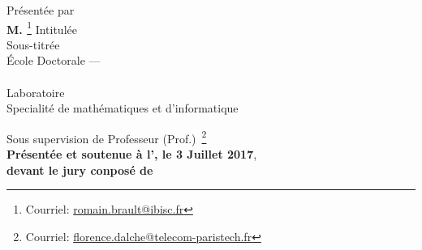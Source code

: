 \begin{titlepage}
\begin{addmargin}[-1cm]{-3cm}
\begin{center}
{                \color{PSaclay}\textsc{\myUniTP}}
            \endgroup
            \bigskip\vfill
            \begingroup
                Pr\'esent\'ee par \\
                {\Large\textbf{M. \textsc{\myName}}}\footnote{Courriel:
                \href{mailto:ro.brault@gmail.com}{romain.brault@ibisc.fr}}
            \endgroup
            \bigskip\vfill
            \begingroup
                Intitul\'ee \\ \smallskip {\Huge
                \color{PSaclay}\textsc{\mySubtitle}}
            \endgroup
            \bigskip
            \vfill
            \begingroup
                Sous-titr\'ee \\ {\Large \textbf{\textsc{\myTitle}}}
            \endgroup
            \bigskip
            \vfill
            \begingroup
                \'Ecole Doctorale --- \EDN\\
                \myDoctoralSchool\\
                Laboratoire \myFaculty\\
                Specialit\'e de math\'ematiques et d'informatique
                \medskip
            \endgroup
        \end{center}
        \vspace{1cm}
        \vfill
        \noindent Sous supervision de
        Professeur (Prof.)~\textsc{\mySupervisor}\footnote{Courriel:
        \href{mailto:florence.dalche@telecom-paristech.fr}%
        {florence.dalche@telecom-paristech.fr}}\\
        \smallskip
        \noindent \textbf{Pr\'esent\'ee et soutenue \`a l'\myUniUEVE, le 3
        Juillet 2017}, \\
        \smallskip
        \noindent \textbf{devant le jury conpos\'e de}

\end{addmargin}
\end{titlepage}
